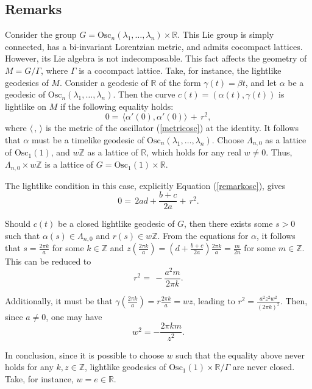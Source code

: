 \documentclass[12pt]{amsart}
\theoremstyle{plain}
\theoremstyle{definition}
\theoremstyle{remark}
\begin{document}
	\subsection{Remarks}
Consider the group \( G = \text{Osc}_n(\lambda_1, \ldots, \lambda_n) \times \mathbb{R} \). This Lie group is simply connected, has a bi-invariant Lorentzian metric, and admits cocompact lattices. However, its Lie algebra is not indecomposable. This fact affects the geometry of \( M = G/\Gamma \), where \( \Gamma \) is a cocompact lattice. Take, for instance, the lightlike geodesics of \( M \). Consider a geodesic of \( \mathbb{R} \) of the form \( \gamma(t) = \beta t \), and let \( \alpha \) be a geodesic of \( \text{Osc}_n(\lambda_1, \ldots, \lambda_n) \). Then the curve \( c(t) = (\alpha(t), \gamma(t)) \) is lightlike on \( M \) if the following equality holds:
\begin{equation}\label{remarkosc}
    0 = \, \langle \alpha'(0), \alpha'(0) \rangle \, + \, r^2,
\end{equation}
where \( \langle \,,\, \rangle \) is the metric of the oscillator (\ref{metricosc}) at the identity. It follows that \( \alpha \) must be a timelike geodesic of \( \text{Osc}_n(\lambda_1, \ldots, \lambda_n) \). Choose \( \Lambda_{n,0} \) as a lattice of \( \text{Osc}_1(1) \), and \( w \mathbb{Z} \) as a lattice of \( \mathbb{R} \), which holds for any real \( w \neq 0 \). Thus, \( \Lambda_{n,0} \times w \mathbb{Z} \) is a lattice of \( G = \text{Osc}_1(1) \times \mathbb{R} \).

The lightlike condition in this case, explicitly Equation (\ref{remarkosc}), gives
\[
0 = \, 2 a d + \frac{b + c}{2a} + \, r^2.
\]

Should \( c(t) \) be a closed lightlike geodesic of \( G \), then there exists some \( s > 0 \) such that \( \alpha(s) \in \Lambda_{n,0} \) and \( r(s) \in w \mathbb{Z} \). From the equations for \( \alpha \), it follows that \( s = \frac{2\pi k}{a} \) for some \( k \in \mathbb{Z} \) and \( z\left(\frac{2\pi k}{a}\right) = \left(d + \frac{b + c}{2a}\right) \frac{2\pi k}{a} = \frac{m}{2n} \) for some \( m \in \mathbb{Z} \). This can be reduced to
\[
r^2 = \, -\frac{a^2 m}{2\pi k}.
\]

Additionally, it must be that \( \gamma\left(\frac{2\pi k}{a}\right) = r \frac{2\pi k}{a} = wz \), leading to \( r^2 = \frac{a^2 z^2 w^2}{(2\pi k)^2} \). Then, since \( a \neq 0 \), one may have
\[
w^2 = -\frac{2\pi k m}{z^2}.
\]

In conclusion, since it is possible to choose \( w \) such that the equality above never holds for any \( k, z \in \mathbb{Z} \), lightlike geodesics of \( \text{Osc}_1(1) \times \mathbb{R}/\Gamma \) are never closed. Take, for instance, \( w = e \in \mathbb{R} \).
 
\end{document}
